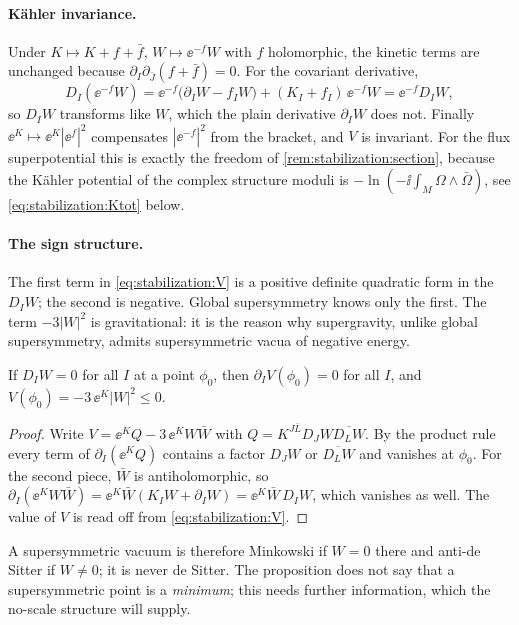 \paragraph{K\"ahler invariance.} Under $K\mapsto K+f+\bar f$, $W\mapsto\ee^{-f}W$ with $f$
holomorphic, the kinetic terms are unchanged because $\partial_I\partial_{\bar J}(f+\bar f)=0$.
For the covariant derivative,
\[
 D_I(\ee^{-f}W)=\ee^{-f}\bigl(\partial_IW-f_IW\bigr)+(K_I+f_I)\,\ee^{-f}W=\ee^{-f}D_IW ,
\]
so $D_IW$ transforms like $W$, which the plain derivative $\partial_IW$ does not. Finally
$\ee^{K}\mapsto\ee^{K}|\ee^{f}|^2$ compensates $|\ee^{-f}|^2$ from the bracket, and $V$ is
invariant. For the flux superpotential this is exactly the freedom of
\cref{rem:stabilization:section}, because the K\"ahler potential of the complex structure
moduli is $-\ln(-\ii\int_M\Omega\wedge\bar\Omega)$, see \eqref{eq:stabilization:Ktot} below.

\paragraph{The sign structure.} The first term in \eqref{eq:stabilization:V} is a positive
definite quadratic form in the $D_IW$; the second is negative. Global supersymmetry knows only
the first. The term $-3|W|^2$ is gravitational: it is the reason why supergravity, unlike
global supersymmetry, admits supersymmetric vacua of negative energy.

\begin{proposition}\label{prop:stabilization:crit}
If $D_IW=0$ for all $I$ at a point $\phi_0$, then $\partial_IV(\phi_0)=0$ for all $I$, and
$V(\phi_0)=-3\,\ee^{K}|W|^2\le0$.
\end{proposition}
\begin{proof}
Write $V=\ee^K Q-3\,\ee^{K}W\bar W$ with $Q=K^{J\bar L}D_JW\overline{D_LW}$. By the product rule
every term of $\partial_I(\ee^KQ)$ contains a factor $D_JW$ or $\overline{D_LW}$ and
vanishes at $\phi_0$. For the second piece, $\bar W$ is antiholomorphic, so
$\partial_I(\ee^KW\bar W)=\ee^K\bar W(K_IW+\partial_IW)=\ee^K\bar W\,D_IW$, which vanishes as
well. The value of $V$ is read off from \eqref{eq:stabilization:V}.
\end{proof}
A supersymmetric vacuum is therefore Minkowski if $W=0$ there and anti-de Sitter if
$W\neq0$; it is never de Sitter. The proposition does not say that a supersymmetric point is
a \emph{minimum}; this needs further information, which the no-scale structure will supply.

